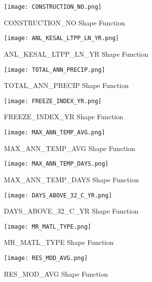 \documentclass{article}
\begin{document}
\begin{figure}[H]
   \centering
   \texttt{[image: CONSTRUCTION\_NO.png]}
   \caption{CONSTRUCTION\_NO Shape Function}
   \label{fig:CONSTRUCTION_NO}
\end{figure}

\begin{figure}[H]
   \centering
   \texttt{[image: ANL\_KESAL\_LTPP\_LN\_YR.png]}
   \caption{ANL\_KESAL\_LTPP\_LN\_YR Shape Function}
   \label{fig:ANL_KESAL_LTPP_LN_YR}
\end{figure}

\begin{figure}[H]
   \centering
   \texttt{[image: TOTAL\_ANN\_PRECIP.png]}
   \caption{TOTAL\_ANN\_PRECIP Shape Function}
   \label{fig:TOTAL_ANN_PRECIP}
\end{figure}

\begin{figure}[H]
   \centering
   \texttt{[image: FREEZE\_INDEX\_YR.png]}
   \caption{FREEZE\_INDEX\_YR Shape Function}
   \label{fig:FREEZE_INDEX_YR}
\end{figure}

\begin{figure}[H]
   \centering
   \texttt{[image: MAX\_ANN\_TEMP\_AVG.png]}
   \caption{MAX\_ANN\_TEMP\_AVG Shape Function}
   \label{fig:MAX_ANN_TEMP_AVG}
\end{figure}

\begin{figure}[H]
   \centering
   \texttt{[image: MAX\_ANN\_TEMP\_DAYS.png]}
   \caption{MAX\_ANN\_TEMP\_DAYS Shape Function}
   \label{fig:MAX_ANN_TEMP_DAYS}
\end{figure}

\begin{figure}[H]
   \centering
   \texttt{[image: DAYS\_ABOVE\_32\_C\_YR.png]}
   \caption{DAYS\_ABOVE\_32\_C\_YR Shape Function}
   \label{fig:DAYS_ABOVE_32_C_YR}
\end{figure}

\begin{figure}[H]
   \centering
   \texttt{[image: MR\_MATL\_TYPE.png]}
   \caption{MR\_MATL\_TYPE Shape Function}
   \label{fig:MR_MATL_TYPE}
\end{figure}

\begin{figure}[H]
   \centering
   \texttt{[image: RES\_MOD\_AVG.png]}
   \caption{RES\_MOD\_AVG Shape Function}
   \label{fig:RES_MOD_AVG}
\end{figure}
\end{document}

